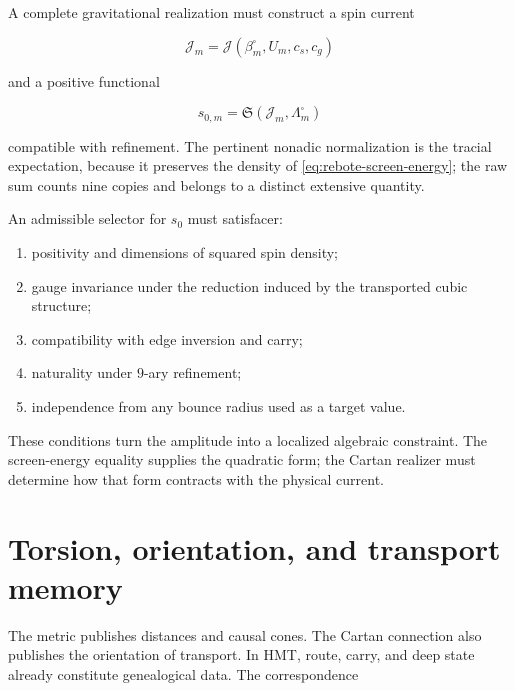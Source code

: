 A complete gravitational realization must construct a spin current

\begin{equation}
 \mathcal J_m
 =\mathcal J(\beta_m^{\square},U_m,c_s,c_g)
 \label{eq:rebote-spin-current}
\end{equation}

and a positive functional

\begin{equation}
 s_{0,m}=\mathfrak S(\mathcal J_m,\Lambda_m^{\square})
 \label{eq:rebote-amplitude-functional}
\end{equation}

compatible with refinement.  The pertinent nonadic normalization is the
tracial expectation, because it preserves the density of
\cref{eq:rebote-screen-energy}; the raw sum counts nine copies and belongs
to a distinct extensive quantity.

\begin{proposition}
An admissible selector for \(s_0\) must satisfacer:
\begin{enumerate}[label=\roman*)]
 \item positivity and dimensions of squared spin density;
 \item gauge invariance under the reduction induced by the transported cubic structure;
 \item compatibility with edge inversion and carry;
 \item naturality under \(9\)-ary refinement;
 \item independence from any bounce radius used as a target value.
\end{enumerate}
\end{proposition}

These conditions turn the amplitude into a localized algebraic constraint. The screen-energy equality supplies the quadratic form; the Cartan realizer must determine how that form contracts with the physical current.

\section{Torsion, orientation, and transport memory}

The metric publishes distances and causal cones.  The Cartan connection
also publishes the orientation of transport.  In HMT, route, carry, and
deep state already constitute genealogical data.  The correspondence

